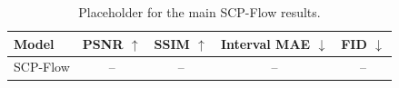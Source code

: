 \begin{table}[ht]
\centering
\caption{Placeholder for the main SCP-Flow results.}
\begin{tabular}{lcccc}
\toprule
Model & PSNR $\uparrow$ & SSIM $\uparrow$ & Interval MAE $\downarrow$ & FID $\downarrow$ \\
\midrule
SCP-Flow & -- & -- & -- & -- \\
\bottomrule
\end{tabular}
\end{table}
